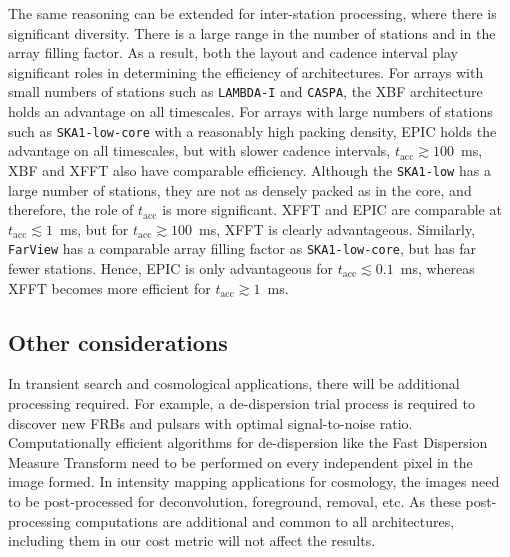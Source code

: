 \documentclass[
  journal=pasa,
  manuscript=article-type,
  year=2020,
  volume=37,
]{cup-journal}
\begin{document}
The same reasoning can be extended for inter-station processing, where there is significant diversity. There is a large range in the number of stations and in the array filling factor. As a result, both the layout and cadence interval play significant roles in determining the efficiency of architectures. For arrays with small numbers of stations such as \texttt{LAMBDA-I} and \texttt{CASPA}, the XBF architecture holds an advantage on all timescales. For arrays with large numbers of stations such as \texttt{SKA1-low-core} with a reasonably high packing density, EPIC holds the advantage on all timescales, but with slower cadence intervals, $t_\textrm{acc}\gtrsim 100$~ms, XBF and XFFT also have comparable efficiency. Although the \texttt{SKA1-low} has a large number of stations, they are not as densely packed as in the core, and therefore, the role of $t_\textrm{acc}$ is more significant. XFFT and EPIC are comparable at $t_\textrm{acc}\lesssim 1$~ms, but for $t_\textrm{acc}\gtrsim 100$~ms, XFFT is clearly advantageous. Similarly, \texttt{FarView} has a comparable array filling factor as \texttt{SKA1-low-core}, but has far fewer stations. Hence, EPIC is only advantageous for $t_\textrm{acc}\lesssim 0.1$~ms, whereas XFFT becomes more efficient for $t_\textrm{acc}\gtrsim 1$~ms. 

\subsection{Other considerations}\label{sec:other-metrics}

In transient search and cosmological applications, there will be additional processing required. For example, a de-dispersion trial process is required to discover new FRBs and pulsars with optimal signal-to-noise ratio. Computationally efficient algorithms for de-dispersion like the Fast Dispersion Measure Transform \citep[FDMT;][]{Zackay+2014} need to be performed on every independent pixel in the image formed. In intensity mapping applications for cosmology, the images need to be post-processed for deconvolution, foreground, removal, etc. As these post-processing computations are additional and common to all architectures, including them in our cost metric will not affect the results. 
\end{document}
